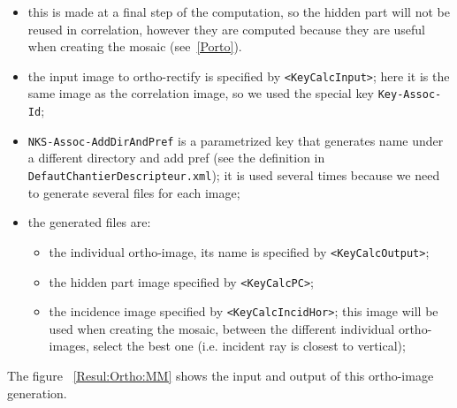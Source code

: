 \begin{itemize}
    \item  this is made at a final step of the computation, so the hidden part will not be reused in correlation,
           however they are computed because they are useful when creating the mosaic (see~\ref{Porto}).

    \item the input image to ortho-rectify is specified by {\tt <KeyCalcInput>}; here it is the same
          image as the correlation image, so we used the special key {\tt Key-Assoc-Id};

    \item {\tt NKS-Assoc-AddDirAndPref} is a parametrized key that generates name under a different directory
          and add pref (see the definition in {\tt DefautChantierDescripteur.xml}); it is used several times
          because we need to generate several files for each image;


    \item the generated files are:

    \begin{itemize}
            \item the individual ortho-image, its name is specified by {\tt <KeyCalcOutput>};
            \item the hidden part image specified by {\tt <KeyCalcPC>};
            \item the incidence image  specified by {\tt <KeyCalcIncidHor>}; this image will be used
                  when creating the mosaic, between the different individual ortho-images, select the best one
                  (i.e. incident ray is closest to vertical);
    \end{itemize}

\end{itemize}

The figure ~\ref{Resul:Ortho:MM} shows the input and output of this ortho-image generation.

